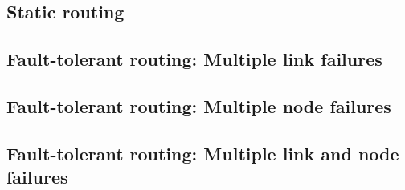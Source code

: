 \subsection{Static routing}

\subsection{Fault-tolerant routing: Multiple link failures}

\subsection{Fault-tolerant routing: Multiple node failures}

\subsection{Fault-tolerant routing: Multiple link and node failures}